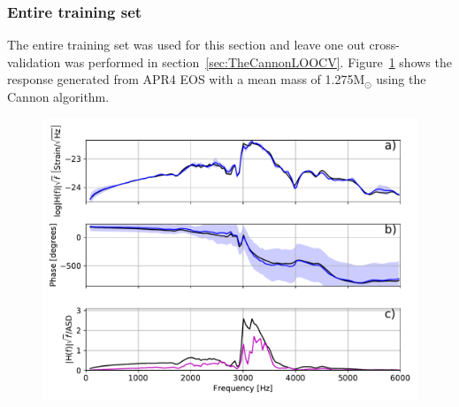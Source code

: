 \subsubsection{Entire training set}
\label{sec:TheCannonEntireTrainingSet}
The entire training set was used for this section and leave one out cross-validation was performed in section~\ref{sec:TheCannonLOOCV}. Figure~\ref{fig:CannonLogAmpPhAPR4-q10-M1275} shows the response generated from APR4 EOS with a mean mass of 1.275M$_\odot$ using the Cannon algorithm.
\begin{figure}[H]
	\includegraphics[width=15cm]{./img/CannonLogAmpPhAPR4-q10-M1275.pdf} 
	\caption[\protect]{\protect}
	\label{fig:CannonLogAmpPhAPR4-q10-M1275}
\end{figure}

